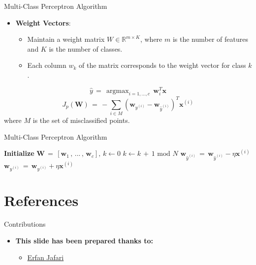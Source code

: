 \documentclass[serif, aspectratio=169]{beamer}
\DeclareMathOperator*{\argmax}{argmax}
\begin{document}
\begin{frame}{Multi-Class Perceptron Algorithm}
    \begin{itemize}
        \item \textbf{Weight Vectors}:
        \medskip
        \begin{itemize}\itemsep.8em
            \item Maintain a weight matrix \( W \in \mathbb{R}^{m \times K} \), where \( m \) is the number of features and \( K \) is the number of classes.
        \item Each column \( w_k \) of the matrix corresponds to the weight vector for class \( k \).
        \end{itemize}
    \end{itemize}
    \hspace{4cm}
    \[
    \hat{y} \, = \, \argmax_{i=1,...,c} \, \mathbf{w}_i^T \mathbf{x}
    \]
    \[
    J_p(\mathbf{W}) \, = \, - \sum_{i \in M}(\mathbf{w}_{y^{(i)}} - \mathbf{w}_{\hat{y}^{(i)}})^T\mathbf{x}^{(i)}
    \]
    where \( M \) is the set of misclassified points.
\end{frame}


\begin{frame}{Multi-Class Perceptron Algorithm}

    \begin{algorithm}[H]
    \caption{Multi-class perceptron}\label{alg:Multi-class perceptron}
    \begin{algorithmic}[1]
        \State \textbf{Initialize} $\mathbf{W} \, = \, [\mathbf{w}_1 \, , \, ... \, , \, \mathbf{w}_c], \, k \leftarrow 0$
            \State \(k \leftarrow k \, + \, 1 \text{ mod } N\)
            \State \(\mathbf{w}_{\hat{y}^{(i)}} \, = \, \mathbf{w}_{\hat{y}^{(i)}} - \eta \mathbf{x}^{(i)}\)
            \State \(\mathbf{w}_{y^{(i)}} \, = \, \mathbf{w}_{y^{(i)}} + \eta \mathbf{x}^{(i)}\)
            \EndIf
        \EndWhile
    \end{algorithmic}
    \end{algorithm}
    
\end{frame}


\section{References}


\begin{frame}{Contributions}
\begin{itemize}
\item \textbf{This slide has been prepared thanks to:}
\medskip
\begin{itemize}
    \item \href{https://github.com/jefri021}{Erfan Jafari}
\end{itemize}
\end{itemize}

\end{frame}


\begin{frame}[allowframebreaks]
    
    
    \nocite{*} %
\end{frame}
\end{document}
